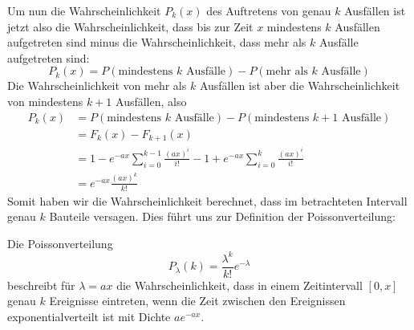 Um nun die Wahrscheinlichkeit $P_k(x)$ des Auftretens von genau $k$ Ausfällen
ist jetzt also die Wahrscheinlichkeit, dass bis zur Zeit $x$ mindestens
$k$ Ausfällen aufgetreten sind minus die Wahrscheinlichkeit, dass mehr
als $k$ Ausfälle aufgetreten sind: 
\[
P_k(x)=P(\text{mindestens $k$ Ausfälle})-P(\text{mehr als $k$ Ausfälle})
\]
Die Wahrscheinlichkeit von mehr als $k$ Ausfällen ist aber die Wahrscheinlichkeit
von mindestens $k+1$ Ausfällen, also
\begin{align*}
P_k(x)
&=P(\text{mindestens $k$ Ausfälle})-P(\text{mindestens $k+1$ Ausfälle})\\
&=F_k(x)-F_{k+1}(x)\\
&=1-e^{-ax}\sum_{i=0}^{k-1}\frac{(ax)^i}{i!}-1+e^{-ax}\sum_{i=0}^{k}\frac{(ax)^i}{i!}\\
&=e^{-ax}\frac{(ax)^k}{k!}
\end{align*}
Somit haben wir die Wahrscheinlichkeit berechnet, dass im betrachteten
Intervall genau $k$ Bauteile versagen.
Dies führt uns zur Definition der Poissonverteilung:
\begin{definition} Die Poissonverteilung
\[
P_\lambda(k)=\frac{\lambda^k}{k!}e^{-\lambda}
\]
beschreibt für $\lambda=ax$ die Wahrscheinlichkeit,
dass in einem Zeitintervall $[0,x]$ genau $k$ Ereignisse eintreten, wenn
die Zeit zwischen den Ereignissen exponentialverteilt ist mit Dichte
$ae^{-ax}$.
\end{definition}

